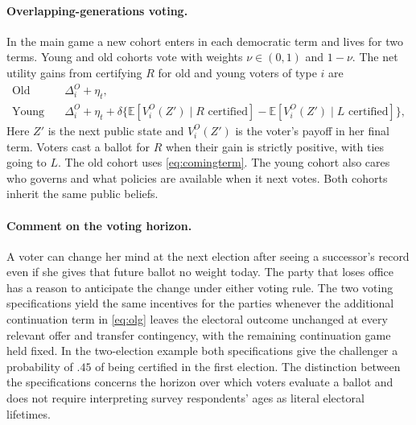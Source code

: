 \documentclass[11pt,letterpaper]{article}
\newcommand{\E}{\mathbb E}
\begin{document}
\paragraph{Overlapping-generations voting.}
In the main game a new cohort enters in each democratic term and lives for two terms. Young and old cohorts vote with weights $\nu\in(0,1)$ and $1-\nu$. The net utility gains from certifying $R$ for old and young voters of type $i$ are
\begin{equation}
 \begin{aligned}
 \text{Old}\quad &\Delta_i^O+\eta_t,\\
 \text{Young}\quad &\Delta_i^O+\eta_t+
 \delta\big\{\E[V_i^O(Z')\mid R\text{ certified}]
             -\E[V_i^O(Z')\mid L\text{ certified}]\big\},
 \end{aligned}
 \label{eq:olg}
\end{equation}
Here $Z'$ is the next public state and $V_i^O(Z')$ is the voter's payoff in her final term. Voters cast a ballot for $R$ when their gain is strictly positive, with ties going to $L$. The old cohort uses \eqref{eq:comingterm}. The young cohort also cares who governs and what policies are available when it next votes. Both cohorts inherit the same public beliefs.

\paragraph{Comment on the voting horizon.}
A voter can change her mind at the next election after seeing a successor's record even if she gives that future ballot no weight today. The party that loses office has a reason to anticipate the change under either voting rule. The two voting specifications yield the same incentives for the parties whenever the additional continuation term in \eqref{eq:olg} leaves the electoral outcome unchanged at every relevant offer and transfer contingency, with the remaining continuation game held fixed. In the two-election example both specifications give the challenger a probability of $.45$ of being certified in the first election. The distinction between the specifications concerns the horizon over which voters evaluate a ballot and does not require interpreting survey respondents' ages as literal electoral lifetimes.
\end{document}

